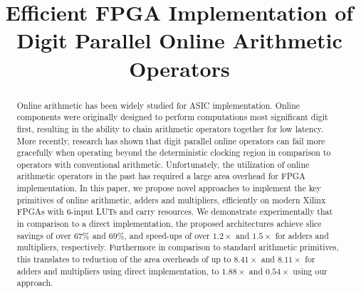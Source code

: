 \documentclass[conference]{IEEEtran}
\begin{document}
\title{Efficient FPGA Implementation of\\ Digit Parallel Online Arithmetic Operators}



\maketitle


\begin{abstract}
Online arithmetic has been widely studied for ASIC implementation. Online components were originally designed to perform computations most significant digit first, resulting in the ability to chain arithmetic operators together for low latency. More recently, research has shown that digit parallel online operators can fail more gracefully when operating beyond the deterministic clocking region in comparison to operators with conventional arithmetic. Unfortunately, the utilization of online arithmetic operators in the past has required a large area overhead for FPGA implementation. In this paper, we propose novel approaches to implement the key primitives of online arithmetic, adders and multipliers, efficiently on modern Xilinx FPGAs with 6-input LUTs and carry resources. We demonstrate experimentally that in comparison to a direct implementation, the proposed architectures achieve slice savings of over $67\%$ and $69\%$, and speed-ups of over $1.2\times$ and $1.5\times$ for adders and multipliers, respectively. Furthermore in comparison to standard arithmetic primitives, this translates to reduction of the area overheads of up to $8.41\times$ and $8.11\times$ for adders and multipliers using direct implementation, to $1.88\times$ and $0.54\times$ using our approach.




\end{abstract}
\end{document}
